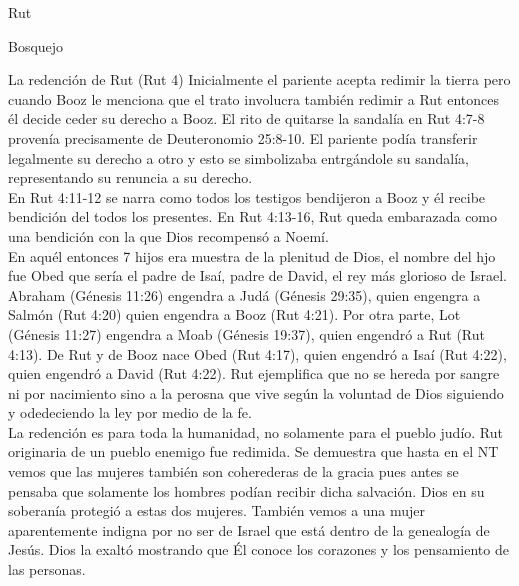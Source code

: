 \begin{section}{Rut}
\begin{subsection}{Bosquejo}
\begin{subsubsection}{La redención de Rut (Rut 4)}
			Inicialmente el pariente acepta redimir la tierra pero cuando Booz le menciona que el trato involucra también redimir a Rut entonces él decide ceder su derecho a Booz. El rito de quitarse la sandalía en Rut 4:7-8 provenía precisamente de Deuteronomio 25:8-10. El pariente podía transferir legalmente su derecho a otro y esto se simbolizaba entrgándole su sandalía, representando su renuncia a su derecho.\\
			En Rut 4:11-12 se narra como todos los testigos bendijeron a Booz y él recibe bendición del todos los presentes. En Rut 4:13-16, Rut queda embarazada como una bendición con la que Dios recompensó a Noemí.\\
			En aquél entonces 7 hijos era muestra de la plenitud de Dios, el nombre del hjo fue Obed que sería el padre de Isaí, padre de David, el rey más glorioso de Israel.\\
			Abraham (Génesis 11:26) engendra a Judá (Génesis 29:35), quien engengra a Salmón (Rut 4:20) quien engendra a Booz (Rut 4:21). Por otra parte, Lot (Génesis 11:27) engendra a Moab (Génesis 19:37), quien engendró a Rut (Rut 4:13). De Rut y de Booz nace Obed (Rut 4:17), quien engendró a Isaí (Rut 4:22), quien engendró a David (Rut 4:22). Rut ejemplifica que no se hereda por sangre ni por nacimiento sino a la perosna que vive según la voluntad de Dios siguiendo y odedeciendo la ley por medio de la fe. \\
			La redención es para toda la humanidad, no solamente para el pueblo judío. Rut originaria de un pueblo enemigo fue redimida. Se demuestra que hasta en el NT vemos que las mujeres también son coherederas de la gracia pues antes se pensaba que solamente los hombres podían recibir dicha salvación. Dios en su soberanía protegió a estas dos mujeres. También vemos a una mujer aparentemente indigna por no ser de Israel que está dentro de la genealogía de Jesús. Dios la exaltó mostrando que Él conoce los corazones y los pensamiento de las personas.
		\end{subsubsection}
	\end{subsection}
\end{section}
%


